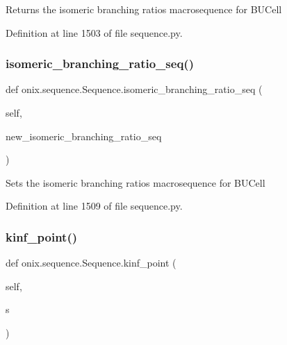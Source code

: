 \begin{DoxyVerb}Returns the isomeric branching ratios macrosequence for BUCell
\end{DoxyVerb}
 

Definition at line 1503 of file sequence.\+py.

\mbox{\label{classonix_1_1sequence_1_1Sequence_a67b5c26a9a7b347b1ae7aef8de995895}} 
\subsubsection{\texorpdfstring{isomeric\+\_\+branching\+\_\+ratio\+\_\+seq()}{isomeric\_branching\_ratio\_seq()}\hspace{0.1cm}{\footnotesize\ttfamily [2/2]}}
{\footnotesize\ttfamily def onix.\+sequence.\+Sequence.\+isomeric\+\_\+branching\+\_\+ratio\+\_\+seq (\begin{DoxyParamCaption}\item[{}]{self,  }\item[{}]{new\+\_\+isomeric\+\_\+branching\+\_\+ratio\+\_\+seq }\end{DoxyParamCaption})}

\begin{DoxyVerb}Sets the isomeric branching ratios macrosequence for BUCell
\end{DoxyVerb}
 

Definition at line 1509 of file sequence.\+py.

\mbox{\label{classonix_1_1sequence_1_1Sequence_a55d08be5c4823700d48d04a0691e0ab0}} 
\subsubsection{\texorpdfstring{kinf\+\_\+point()}{kinf\_point()}}
{\footnotesize\ttfamily def onix.\+sequence.\+Sequence.\+kinf\+\_\+point (\begin{DoxyParamCaption}\item[{}]{self,  }\item[{}]{s }\end{DoxyParamCaption})}


